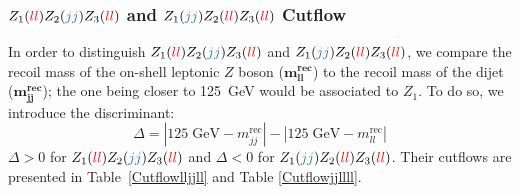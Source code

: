 \documentclass[a4paper,11pt]{article}
\begin{document}
    \noindent
    \newpage
    \subsubsection[$Z_1(\textcolor{red}{ll})Z_2(\textcolor{NavyBlue}{jj})Z_3(\textcolor{red}{ll})$ and $Z_1(\textcolor{NavyBlue}{jj})Z_2(\textcolor{red}{ll})Z_3(\textcolor{red}{ll})$ Cutflow]{\boldmath$Z_1(\textcolor{red}{ll})Z_2(\textcolor{NavyBlue}{jj})Z_3(\textcolor{red}{ll})$ and $Z_1(\textcolor{NavyBlue}{jj})Z_2(\textcolor{red}{ll})Z_3(\textcolor{red}{ll})$ Cutflow}
    In order to distinguish $Z_1(\textcolor{red}{ll})Z_2(\textcolor{NavyBlue}{jj})Z_3(\textcolor{red}{ll})$ and $Z_1(\textcolor{NavyBlue}{jj})Z_2(\textcolor{red}{ll})Z_3(\textcolor{red}{ll})$, we compare the recoil mass of the on-shell leptonic $Z$ boson ($\boldsymbol{m^{\mbox{rec}}_{ll}}$) to the recoil mass of the dijet ($\boldsymbol{m^{\mbox{rec}}_{jj}}$); the one being closer to 125~GeV would be associated to $Z_1$. To do so, we introduce the discriminant:
    \begin{equation}
        \Delta=|125\;\mbox{GeV}-m^{\mbox{rec}}_{jj}|-|125\;\mbox{GeV}-m^{\mbox{rec}}_{ll}|
    \end{equation} 
    $\Delta>0$ for $Z_1(\textcolor{red}{ll})Z_2(\textcolor{NavyBlue}{jj})Z_3(\textcolor{red}{ll})$ and $\Delta<0$ for $Z_1(\textcolor{NavyBlue}{jj})Z_2(\textcolor{red}{ll})Z_3(\textcolor{red}{ll})$. Their cutflows are presented in Table~\ref{Cutflowlljjll} and Table \ref{Cutflowjjllll}.
\end{document}
